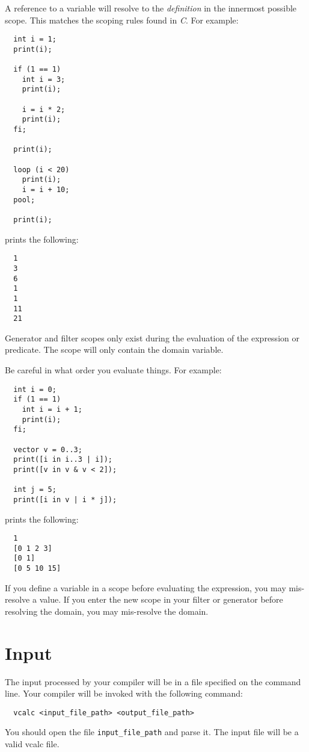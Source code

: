 \documentclass{article}
\newcommand{\code}[1]{\texttt{\textmd{#1}}}
\begin{document}
A reference to a variable will resolve to the \textit{definition} in the innermost possible scope.
This matches the scoping rules found in \textit{C}. For example:
\begin{lstlisting}
  int i = 1;
  print(i);

  if (1 == 1)
    int i = 3;
    print(i);

    i = i * 2;
    print(i);
  fi;

  print(i);

  loop (i < 20)
    print(i);
    i = i + 10;
  pool;

  print(i);
\end{lstlisting}

prints the following:
\begin{lstlisting}
  1
  3
  6
  1
  1
  11
  21
\end{lstlisting}

Generator and filter scopes only exist during the evaluation of the expression or predicate. The
scope will only contain the domain variable.

Be careful in what order you evaluate things. For example:
\begin{lstlisting}
  int i = 0;
  if (1 == 1)
    int i = i + 1;
    print(i);
  fi;

  vector v = 0..3;
  print([i in i..3 | i]);
  print([v in v & v < 2]);

  int j = 5;
  print([i in v | i * j]);
\end{lstlisting}

prints the following:
\begin{lstlisting}
  1
  [0 1 2 3]
  [0 1]
  [0 5 10 15]
\end{lstlisting}

If you define a variable in a scope before evaluating the expression, you may mis-resolve a value.
If you enter the new scope in your filter or generator before resolving the domain, you may
mis-resolve the domain.

\section{Input}
The input processed by your compiler will be in a file specified on the command line. Your
compiler will be invoked with the following command:
\begin{lstlisting}
  vcalc <input_file_path> <output_file_path>
\end{lstlisting}
You should open the file \code{input\_file\_path} and parse it. The input file will be a valid
vcalc file.
\end{document}
